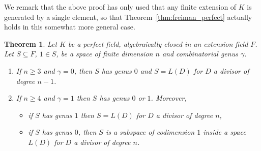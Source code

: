 \documentclass{article}
\theoremstyle{plain}
\newtheorem{thm}{Theorem}[section]
\theoremstyle{definition}
\theoremstyle{remark}
\renewcommand{\geq}{\geqslant}
\begin{document}
{
We remark that the above proof has only used that
any finite extension of $K$ is generated by a single element,
so that Theorem~\ref{thm:freiman_perfect} actually holds 
in this somewhat more general case.
}

{
\begin{thm}\label{thm:perfect}
  Let $K$ be a perfect field, algebraically closed in an extension
  field $F$.
  Let $S \subseteq F$, $1\in S$, be a space of finite dimension $n$
  and combinatorial genus $\gamma$. 
  \begin{enumerate}
  \item If $n\geq 3$ and $\gamma=0$, then $S$ has genus $0$ and
    $S=L(D)$ for $D$ a divisor of degree $n-1$.
  \item If $n\geq 4$ and $\gamma=1$ 
   then $S$ has genus $0$ or $1$. Moreover, 
  \begin{itemize}
    \item[(i)]  if $S$ has genus $1$  then $S=L(D)$ for $D$ a divisor of degree $n$,
    \item[(ii)] if $S$ has genus $0$, then $S$ is a subspace of codimension
      $1$ inside a space $L(D)$ for $D$ a divisor of degree $n$.
  \end{itemize}
  \end{enumerate}
 \end{thm}
}
\end{document}

